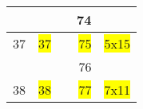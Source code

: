 \begin{tabular}{|r|r|r|r|r|}
\hline                              &                        &         &     74    &                                \\
\hline               37             &   \colorbox{yellow}{37}&         &     \colorbox{yellow}{75}    &     \colorbox{yellow}{5x15  }  \\
\hline                              &                        &         &     76    &                                \\
\hline               38             &   \colorbox{yellow}{38}&         &     \colorbox{yellow}{77}    &     \colorbox{yellow}{7x11  }  \\
\hline
\end{tabular}

\pagebreak


